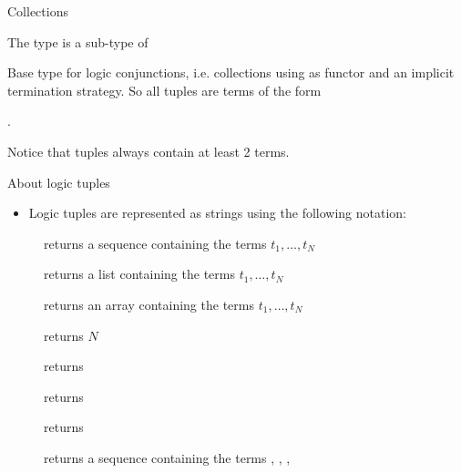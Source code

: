 \documentclass[handout]{beamer}
\begin{document}
\begin{frame}[allowframebreaks]{Collections}

    \framebreak

    \begin{block}{The  type is a sub-type of }
        \begin{center}
            Base type for logic conjunctions, i.e. collections using  as functor and an implicit termination strategy.
            So all tuples are terms of the form
            \begin{center}
                .
            \end{center}
            Notice that tuples always contain at least 2 terms.
        \end{center}
    \end{block}
    \begin{alertblock}{About logic tuples}
        \begin{itemize}
            \item Logic tuples are represented as strings using the following notation:
            \begin{center}
            \end{center}
        \end{itemize}
    \end{alertblock}
    \begin{description}
        \item[] returns a sequence containing the terms $t_1, \ldots, t_N$
        \item[] returns a list containing the terms $t_1, \ldots, t_N$
        \item[] returns an array containing the terms $t_1, \ldots, t_N$
        \item[] returns $N$
        \item[] returns 
        \item[] returns 
        \item[] returns 
        \item[] returns a sequence containing the terms , , \pl{\ldots}, 
    \end{description}


\end{frame}
\end{document}
